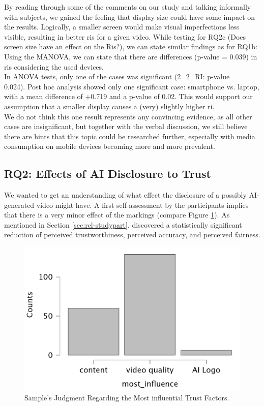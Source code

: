 \documentclass[
  a4paper,  %
  twoside,  %
  bibliography=totoc,
  headsepline,
  cleardoublepage=empty,
  parskip=half,
  draft=false
]{scrbook}
\begin{document}
By reading through some of the comments on our study and talking informally with subjects, we gained the feeling that display size could have some impact on the results. Logically, a smaller screen would make visual imperfections less visible, resulting in better \gls{ri}s for a given video. While testing for RQ2c (Does screen size have an effect on the Ris?), we can state similar findings as for RQ1b: Using the MANOVA, we can state that there are differences (p-value = 0.039) in \gls{ri}s considering the used devices. \\
In ANOVA tests, only one of the cases was significant (2\_2\_RI: p-value = 0.024). Post hoc analysis showed only one significant case: smartphone vs. laptop, with a mean difference of +0.719 and a p-value of 0.02. This would support our assumption that a smaller display causes a (very) slightly higher \gls{ri}. \\
We do not think this one result represents any convincing evidence, as all other cases are insignificant, but together with the verbal discussion, we still believe there are hints that this topic could be researched further, especially with media consumption on mobile devices becoming more and more prevalent.

\subsection{RQ2: Effects of AI Disclosure to Trust}
\label{subsec:RQ2}
We wanted to get an understanding of what effect the disclosure of a possibly AI-generated video might have. A first self-assessment by the participants implies that there is a very minor effect of the markings (compare Figure \ref{fig:most-influence}). As mentioned in Section \ref{sec:rel-studypart},  discovered a statistically significant reduction of perceived trustworthiness, perceived accuracy, and perceived fairness. 

\begin{figure}[h]
  \centering
  \includegraphics[width=.5\textwidth]{graphics/statistics/most-influence.png}
  \caption{Sample's Judgment Regarding the Most influential Trust Factors.}
  \label{fig:most-influence}
\end{figure}
\end{document}
